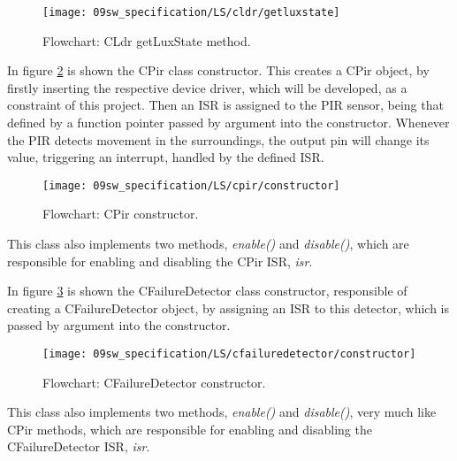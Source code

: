 \begin{figure}[H]
	\centering
	\texttt{[image: 09sw\_specification/LS/cldr/getluxstate]}
	\caption{Flowchart: CLdr getLuxState method.}
	\label{fig:CLdrgetLuxState}
\end{figure}

\clearpage
{}

In figure \ref{fig:CPirconstructor} is shown the CPir class constructor. This creates a CPir object, by firstly inserting the respective device driver, which will be developed, as a constraint of this project. Then an ISR is assigned to the PIR sensor, being that defined by a function pointer passed by argument into the constructor. Whenever the PIR detects movement in the surroundings, the output pin will change its value, triggering an interrupt, handled by the defined ISR.

\begin{figure}[H]
	\centering
	\texttt{[image: 09sw\_specification/LS/cpir/constructor]}
	\caption{Flowchart: CPir constructor.}
	\label{fig:CPirconstructor}
\end{figure}

This class also implements two methods, \textit{enable()} and \textit{disable()}, which are responsible for enabling and disabling the CPir ISR, \textit{isr}.

\clearpage
{}

In figure \ref{fig:CFailureDetectorConstr} is shown the CFailureDetector class constructor, responsible of creating a CFailureDetector object, by assigning an ISR to this detector, which is passed by argument into the constructor.

\begin{figure}[H]
	\centering
	\texttt{[image: 09sw\_specification/LS/cfailuredetector/constructor]}
	\caption{Flowchart: CFailureDetector constructor.}
	\label{fig:CFailureDetectorConstr}
\end{figure}

This class also implements two methods, \textit{enable()} and \textit{disable()}, very much like CPir methods, which are responsible for enabling and disabling the CFailureDetector ISR, \textit{isr}.
